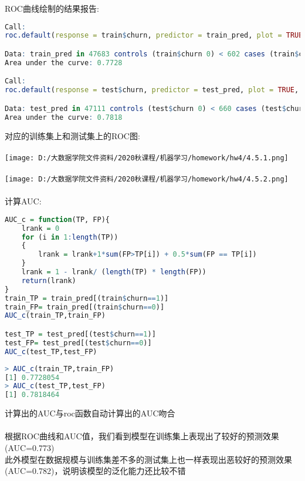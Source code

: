 \documentclass[]{article}
\begin{document}
ROC曲线绘制的结果报告:
\begin{lstlisting}[language=R]
Call:
roc.default(response = train$churn, predictor = train_pred, plot = TRUE,     main = "训练集ROC曲线", xlab = "FPR", ylab = "TPR", print.thres = TRUE,     print.auc = TRUE, legacy.axes = TRUE, grid = c(0.2, 0.2),     grid.col = "dimgray", auc.polygon = TRUE, max.auc.polygon = TRUE,     auc.polygon.col = "darkslategray1", max.auc.polygon.col = "deepskyblue")

Data: train_pred in 47683 controls (train$churn 0) < 602 cases (train$churn 1).
Area under the curve: 0.7728

Call:
roc.default(response = test$churn, predictor = test_pred, plot = TRUE,     main = "测试集ROC曲线", xlab = "FPR", ylab = "TPR", print.thres = TRUE,     print.auc = TRUE, legacy.axes = TRUE, grid = c(0.2, 0.2),     grid.col = "dimgray", auc.polygon = TRUE, max.auc.polygon = TRUE,     auc.polygon.col = "darkslategray1", max.auc.polygon.col = "deepskyblue")

Data: test_pred in 47111 controls (test$churn 0) < 660 cases (test$churn 1).
Area under the curve: 0.7818
\end{lstlisting}
对应的训练集上和测试集上的ROC图:\\\\
\texttt{[image: D:/大数据学院文件资料/2020秋课程/机器学习/homework/hw4/4.5.1.png]}\\\\
\texttt{[image: D:/大数据学院文件资料/2020秋课程/机器学习/homework/hw4/4.5.2.png]}\\\\
计算AUC:
\begin{lstlisting}[language=R]
AUC_c = function(TP, FP){
	lrank = 0
	for (i in 1:length(TP))
	{
		lrank = lrank+1*sum(FP>TP[i]) + 0.5*sum(FP == TP[i])
	}
	lrank = 1 - lrank/ (length(TP) * length(FP))
	return(lrank)
}	
train_TP = train_pred[(train$churn==1)]
train_FP= train_pred[(train$churn==0)]
AUC_c(train_TP,train_FP)

test_TP = test_pred[(test$churn==1)]
test_FP= test_pred[(test$churn==0)]
AUC_c(test_TP,test_FP)
\end{lstlisting}
\begin{lstlisting}[language=R]
> AUC_c(train_TP,train_FP)
[1] 0.7728054
> AUC_c(test_TP,test_FP)
[1] 0.7818464
\end{lstlisting}
计算出的AUC与roc函数自动计算出的AUC吻合\\\\
根据ROC曲线和AUC值，我们看到模型在训练集上表现出了较好的预测效果(AUC=0.773)\\
此外模型在数据规模与训练集差不多的测试集上也一样表现出恶较好的预测效果(AUC=0.782)，说明该模型的泛化能力还比较不错
\end{document}

